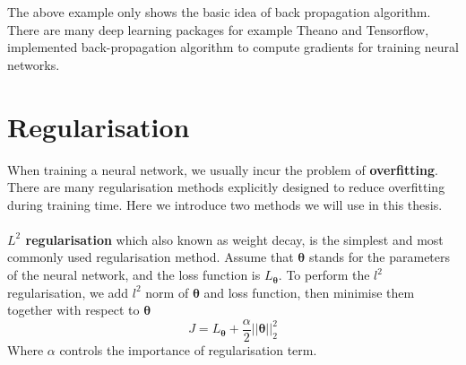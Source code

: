 \noindent
The above example only shows the basic idea of back propagation algorithm. There are many deep learning packages for example Theano\cite{2016arXiv160502688short} and Tensorflow\cite{tensorflow2015-whitepaper}, implemented back-propagation algorithm to compute gradients for training neural networks.
\section{Regularisation}
When training a neural network, we usually incur the problem of \textbf{overfitting}. 
There are many regularisation methods explicitly designed to reduce overfitting during training time. Here we introduce two methods we will use in this thesis.\\\\
\textbf{$L^{2}$ regularisation} which also known as weight decay, is the simplest and most commonly used regularisation method. 
Assume that $\mathbf{\theta}$ stands for the parameters of the neural network, and the loss function is $L_{\mathbf{\theta}}$. 
To perform the $l^{2}$ regularisation, we add $l^{2}$ norm of $\mathbf{\theta}$ and loss function, then minimise them together with respect to $\mathbf{\theta}$
\begin{equation}
J = L_{\mathbf{\theta}} + \frac{\alpha}{2}||\mathbf{\theta}||_{2}^{2}
\end{equation}
Where $\alpha$ controls the importance of regularisation term.

